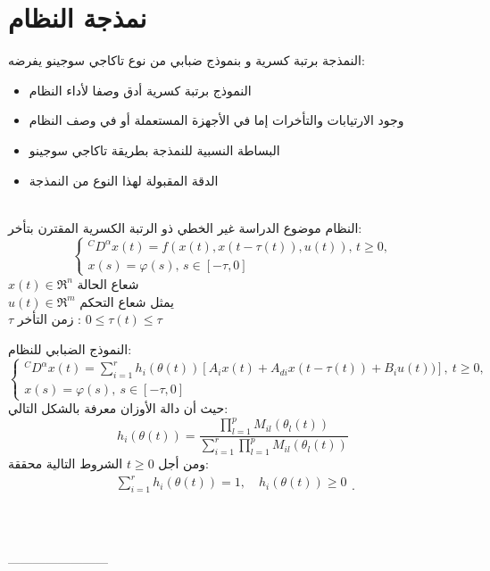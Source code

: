 \documentclass[dvipsnames,mathserif]{beamer}
\begin{document}
{\section{نمذجة النظام}
\begin{frame}
\footnotesize
النمذجة برتبة كسرية و بنموذج ضبابي من نوع تاكاجي سوجينو يفرضه:
\begin{itemize}
    \item النموذج برتبة كسرية أدق وصفا لأداء النظام
    \item وجود الارتيابات والتأخرات إما في الأجهزة المستعملة أو في وصف النظام
    \item البساطة النسبية للنمذجة بطريقة تاكاجي سوجينو
    \item الدقة المقبولة لهذا النوع من النمذجة
\end{itemize}
  \pause
\quad \\
 النظام موضوع الدراسة غير الخطي ذو الرتبة الكسرية المقترن بتأخر: 
\begin{equation*}
\left\{\begin{array}{l}
{ }^C D^\alpha x(t)=f(x(t),x(t-\tau(t)),u(t)),\, t \geq 0, \\
x(s)=\varphi(s),\, s \in[-\tau, 0]
\end{array}\right.
\end{equation*}
$x(t) \in \Re ^{n}$  شعاع الحالة\\
$u(t) \in \Re ^{m}$  يمثل شعاع التحكم \\
$\tau$ زمن التأخر : $ 0 \leq  \tau(t) \leq \tau$
\end{frame}
\begin{frame}
\footnotesize
 النموذج الضبابي  للنظام:
\begin{equation*}
\left\{\begin{array}{l}
{ }^C D^\alpha x(t)=\sum_{i=1}^{r} h_{i}(\theta(t))[A_{i}x(t)+A_{di}x(t-\tau(t))+B_{i}u(t))],\ t \geq 0, \\
x(s)=\varphi(s), \ s \in[-\tau, 0]
\end{array}\right.
\end{equation*}
 \pause
حيث أن دالة الأوزان معرفة بالشكل التالي: 
\begin{equation*}
 h_{i}(\theta(t))=\frac{ \prod_{l=1}^{p} M_{il}(\theta_{l}(t)) }{ \sum_{i=1}^{r} \prod_{l=1}^{p} M_{il}(\theta_{l}(t)) }  
\end{equation*}
ومن أجل $ t\geq 0$ الشروط التالية محققة: \\
\begin{equation*}
\begin{array}{l}
\sum_{i=1}^{r} h_{i}(\theta(t))=1, \quad  
h_{i}(\theta(t)) \geq 0 \\
\end{array}.
\end{equation*}
\qquad\\ \qquad\\ \qquad\\
------------------------\\ 


\end{frame}}
\end{document}

